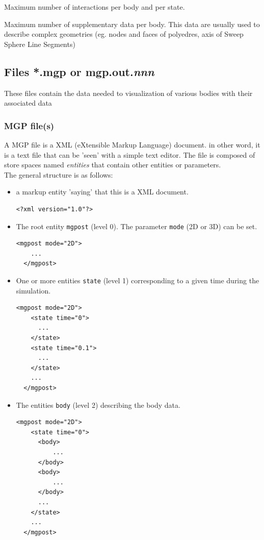 \documentclass{simpledoc}
\newcommand{\screen}[1]{\texttt{#1}}
\begin{document}
Maximum number of interactions per body and per state.

Maximum number of supplementary data per body. This data are usually used to describe complex geometries (eg. nodes and faces of polyedres, axis of Sweep Sphere Line Segments)

\subsection{Files *.mgp or mgp.out.\textit{nnn}}

These files contain the data needed to
visualization of various bodies with their associated data

\subsubsection{MGP file(s)}

A MGP file is a XML (eXtensible Markup Language) document. in other word, it is a text file that can be 'seen' with a simple text editor.
The file is composed of store spaces named \textit{entities} that contain other entities or parameters.\\ 

The general structure is as follows:\\

\begin{itemize}

\item a markup entity 'saying' that this is a XML document.

\begin{lstlisting}[style=mgpdata]
  <?xml version="1.0"?>
\end{lstlisting}

\item The root entity \screen{mgpost} (level 0). The parameter \screen{mode} (2D or 3D) can be set.

\begin{lstlisting}[style=mgpdata]
  <mgpost mode="2D">
    ...
  </mgpost>
\end{lstlisting}

\item One or more entities \screen{state} (level 1) corresponding to a given time during the simulation.

\begin{lstlisting}[style=mgpdata]
  <mgpost mode="2D">
    <state time="0">
      ...
    </state>
    <state time="0.1">
      ...
    </state>
    ...
  </mgpost>
\end{lstlisting}

\item The entities \texttt{body} (level 2) describing the body data.

\begin{lstlisting}[style=mgpdata]
  <mgpost mode="2D">
    <state time="0">
      <body>
          ...
      </body>
      <body>
          ...
      </body>
      ...
    </state>
    ...
  </mgpost>
\end{lstlisting}

\end{itemize}
\end{document}
